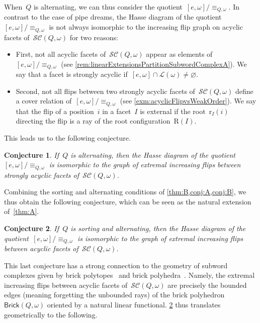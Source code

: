 \documentclass[reqno]{amsart}
\newtheorem{conjectureA}{Conjecture}
\theoremstyle{definition}
\newcommand{\linearExtensions}{\mathcal{L}} %
\newcommand{\subwordComplex}{\mathcal{SC}} %
\newcommand{\Roots}{\mathrm{R}} %
\newcommand{\rootFunction}[2]{\mathrm{r}_{#1}(#2)} %
\newcommand{\brickPolyhedron}{\mathsf{Brick}} %
\begin{document}
When~$Q$ is alternating, we can thus consider the quotient~$[e, \omega]/{\equiv_{Q, \omega}}$.
In contrast to the case of pipe dreams, the Hasse diagram of the quotient~$[e, \omega]/{\equiv_{Q, \omega}}$ is not always isomorphic to the increasing flip graph on acyclic facets of~$\subwordComplex(Q, \omega)$ for two reasons:
\begin{itemize}
\item First, not all acyclic facets of~$\subwordComplex(Q, \omega)$ appear as elements of~$[e, \omega]/{\equiv_{Q, \omega}}$ (see \cref{rem:linearExtensionsPartitionSubwordComplexA}). We say that a facet is strongly acyclic if~$[e, \omega] \cap \linearExtensions(\omega) \ne \varnothing$.
\item Second, not all flips between two strongly acyclic facets of~$\subwordComplex(Q, \omega)$ define a cover relation of~$[e, \omega]/{\equiv_{Q, \omega}}$ (see \cref{exm:acyclicFlipvsWeakOrder}). We say that the flip of a position~$i$ in a facet~$I$ is external if the root~$\rootFunction{I}{i}$ directing the flip is a ray of the root configuration~$\Roots(I)$.
\end{itemize}
This leads us to the following conjecture.

\begin{conjectureA}
\label{conj:B}
If~$Q$ is alternating, then the Hasse diagram of the quotient~$[e, \omega]/\equiv_{Q, \omega}$ is isomorphic to the graph of extremal increasing flips between strongly acyclic facets of~$\subwordComplex(Q, \omega)$.
\end{conjectureA}

Combining the sorting and alternating conditions of \cref{thm:B,conj:A,conj:B}, we thus obtain the following conjecture, which can be seen as the natural extension of~\cref{thm:A}.

\begin{conjectureA}
\label{conj:C}
If~$Q$ is sorting and alternating, then the Hasse diagram of the quotient~$[e, \omega]/\equiv_{Q, \omega}$ is isomorphic to the graph of extremal increasing flips between acyclic facets of~$\subwordComplex(Q, \omega)$.
\end{conjectureA}

This last conjecture has a strong connection to the geometry of subword complexes given by brick polytopes~\cite{PilaudSantos-brickPolytope, PilaudStump-brickPolytope} and brick polyhedra~\cite{JahnStump}.
Namely, the extremal increasing flips between acyclic facets of~$\subwordComplex(Q, \omega)$ are precisely the bounded edges (meaning forgetting the unbounded rays) of the brick polyhedron~$\brickPolyhedron(Q, \omega)$ oriented by a natural linear functional.
\cref{conj:C} thus translates geometrically to the following.
\end{document}
